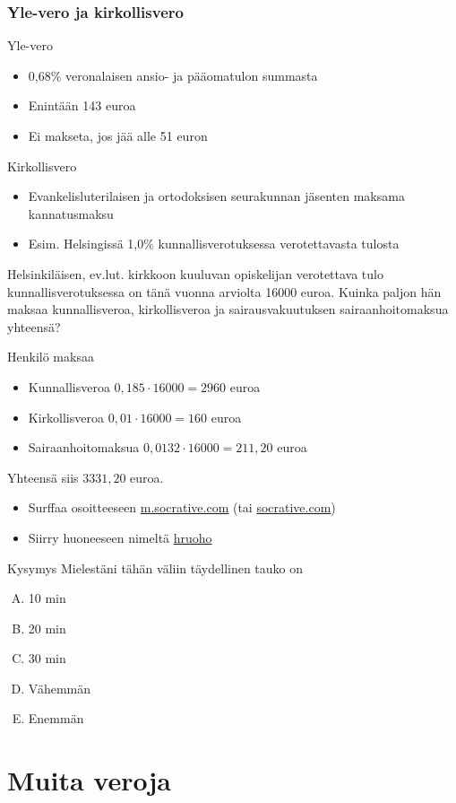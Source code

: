 \documentclass[handout]{beamer}
\newcommand{\socrativeOhje}{
\begin{itemize}
\item Surffaa osoitteeseen \url{m.socrative.com} (tai \url{socrative.com})
\item Siirry huoneeseen nimeltä \url{hruoho}
\end{itemize}
}
\newcommand{\taukoKysymys}{
\socrativeOhje
	\begin{block}{Kysymys}
	Mielestäni tähän väliin täydellinen tauko on
	\begin{enumerate}[(A)]
		\item 10 min
		\item 20 min
		\item 30 min
		\item Vähemmän 
		\item Enemmän
	\end{enumerate}	
	\end{block}
}
\begin{document}
\begin{frame}
\frametitle{Yle-vero ja kirkollisvero}
\begin{block}{Yle-vero}
	\begin{itemize}
		\item 0,68\% veronalaisen ansio- ja pääomatulon summasta
		\item Enintään 143 euroa
		\item Ei makseta, jos jää alle 51 euron
	\end{itemize}
\end{block}
\pause
\begin{block}{Kirkollisvero}
	\begin{itemize}
		\item Evankelisluterilaisen ja ortodoksisen seurakunnan jäsenten maksama kannatusmaksu
		\item Esim. Helsingissä 1,0\% kunnallisverotuksessa verotettavasta tulosta
	\end{itemize}
\end{block}
\end{frame}

\begin{frame}
	\begin{esim}
		Helsinkiläisen, ev.lut. kirkkoon kuuluvan opiskelijan verotettava tulo kunnallisverotuksessa on tänä vuonna arviolta 16000 euroa. Kuinka paljon hän maksaa kunnallisveroa, kirkollisveroa ja sairausvakuutuksen sairaanhoitomaksua yhteensä?
	\end{esim}
	\begin{ratkaisu}
		Henkilö maksaa
		\begin{itemize}
			\item Kunnallisveroa \pause \(0,185\cdot16000 = 2960\) euroa \pause
			\item Kirkollisveroa \pause \(0,01\cdot 16000 = 160\) euroa\pause
			\item Sairaanhoitomaksua \pause \(0,0132\cdot 16000 = 211,20\) euroa
		\end{itemize}
		\pause Yhteensä siis \(3331,20\) euroa.
	\end{ratkaisu}
\end{frame}

\begin{frame}
\taukoKysymys
\end{frame}

\section{Muita veroja}
\end{document}
